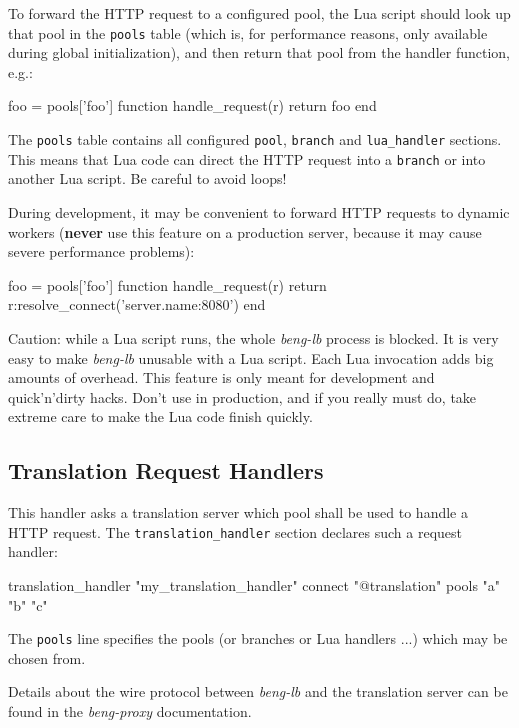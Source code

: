 \documentclass[a4paper,12pt]{article}
\begin{document}
To forward the HTTP request to a configured pool, the Lua script
should look up that pool in the \verb|pools| table (which is, for
performance reasons, only available during global initialization), and
then return that pool from the handler function, e.g.:

\begin{verbatim*}
foo = pools['foo']
function handle_request(r)
   return foo
end
\end{verbatim*}

The \verb|pools| table contains all configured \verb|pool|,
\verb|branch| and \verb|lua_handler| sections.  This means that Lua
code can direct the HTTP request into a \verb|branch| or into another
Lua script.  Be careful to avoid loops!

During development, it may be convenient to forward HTTP requests to
dynamic workers (\textbf{never} use this feature on a production
server, because it may cause severe performance problems):

\begin{verbatim*}
foo = pools['foo']
function handle_request(r)
   return r:resolve_connect('server.name:8080')
end
\end{verbatim*}

Caution: while a Lua script runs, the whole \emph{beng-lb} process is
blocked.  It is very easy to make \emph{beng-lb} unusable with a Lua
script.  Each Lua invocation adds big amounts of overhead.  This
feature is only meant for development and quick'n'dirty hacks.  Don't
use in production, and if you really must do, take extreme care to
make the Lua code finish quickly.

\subsection{Translation Request Handlers}

This handler asks a translation server which pool shall be used to
handle a HTTP request.  The \verb|translation_handler| section
declares such a request handler:

\begin{verbatim*}
translation_handler "my_translation_handler" {
  connect "@translation"
  pools "a" "b" "c"
}
\end{verbatim*}

The \verb|pools| line specifies the pools (or branches or Lua handlers
...) which may be chosen from.

Details about the wire protocol between \emph{beng-lb} and the
translation server can be found in the \emph{beng-proxy}
documentation.
\end{document}
